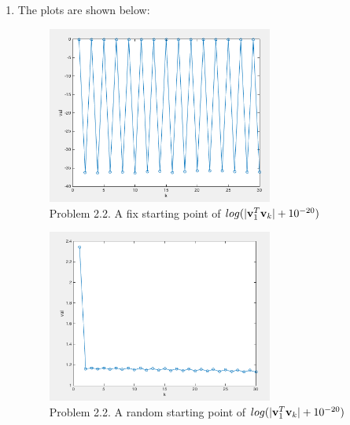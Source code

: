 \documentclass{article}
\begin{document}
\begin{enumerate}
\item 
The plots are shown below: \\
\begin{figure} 
\includegraphics[width=0.7\textwidth]{problem2_2_1_fixed}
\centering
\caption{Problem 2.2.  A fix starting point of $log(|\boldsymbol{\mathrm{v}}_1^T\boldsymbol{\mathrm{v}}_k|+10^{-20})$} 
\end{figure} 
\begin{figure} 
\includegraphics[width=0.7\textwidth]{problem2_2_1_random}
\centering
\caption{Problem 2.2.  A random starting point of $ log(|\boldsymbol{\mathrm{v}}_1^T\boldsymbol{\mathrm{v}}_k|+10^{-20})$} 
\end{figure} 



\end{enumerate}
\end{document}
